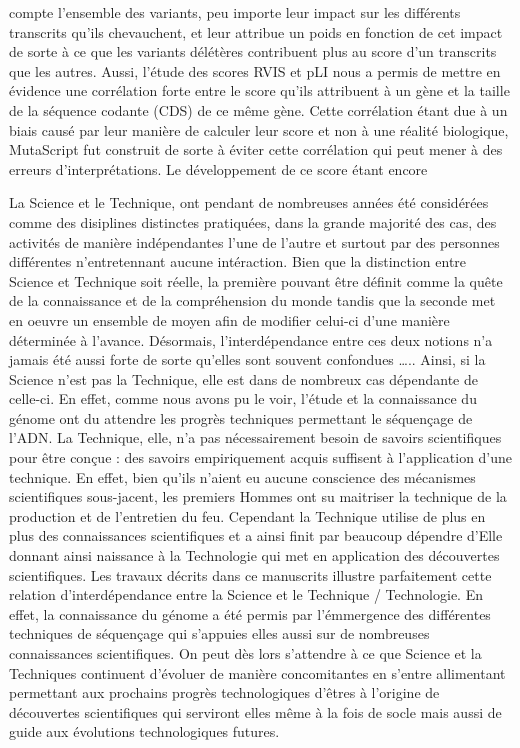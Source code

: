 \documentclass[12pt,twoside]{reedthesis}
\theoremstyle{definition}
\theoremstyle{definition}
\theoremstyle{remark}
\begin{document}
  compte l'ensemble des variants, peu importe leur impact sur les
  différents transcrits qu'ils chevauchent, et leur attribue un poids en
  fonction de cet impact de sorte à ce que les variants délétères
  contribuent plus au score d'un transcrits que les autres. Aussi, l'étude
  des scores RVIS et pLI nous a permis de mettre en évidence une
  corrélation forte entre le score qu'ils attribuent à un gène et la
  taille de la séquence codante (CDS) de ce même gène. Cette corrélation
  étant due à un biais causé par leur manière de calculer leur score et
  non à une réalité biologique, MutaScript fut construit de sorte à éviter
  cette corrélation qui peut mener à des erreurs d'interprétations. Le
  développement de ce score étant encore
  
  La Science et le Technique, ont pendant de nombreuses années été
  considérées comme des disiplines distinctes pratiquées, dans la grande
  majorité des cas, des activités de manière indépendantes l'une de
  l'autre et surtout par des personnes différentes n'entretennant aucune
  intéraction. Bien que la distinction entre Science et Technique soit
  réelle, la première pouvant être définit comme la quête de la
  connaissance et de la compréhension du monde tandis que la seconde met
  en oeuvre un ensemble de moyen afin de modifier celui-ci d'une manière
  déterminée à l'avance. Désormais, l'interdépendance entre ces deux
  notions n'a jamais été aussi forte de sorte qu'elles sont souvent
  confondues \ldots{}.. Ainsi, si la Science n'est pas la Technique, elle
  est dans de nombreux cas dépendante de celle-ci. En effet, comme nous
  avons pu le voir, l'étude et la connaissance du génome ont du attendre
  les progrès techniques permettant le séquençage de l'ADN. La Technique,
  elle, n'a pas nécessairement besoin de savoirs scientifiques pour être
  conçue : des savoirs empiriquement acquis suffisent à l'application
  d'une technique. En effet, bien qu'ils n'aient eu aucune conscience des
  mécanismes scientifiques sous-jacent, les premiers Hommes ont su
  maitriser la technique de la production et de l'entretien du feu.
  Cependant la Technique utilise de plus en plus des connaissances
  scientifiques et a ainsi finit par beaucoup dépendre d'Elle donnant
  ainsi naissance à la Technologie qui met en application des découvertes
  scientifiques. Les travaux décrits dans ce manuscrits illustre
  parfaitement cette relation d'interdépendance entre la Science et le
  Technique / Technologie. En effet, la connaissance du génome a été
  permis par l'émmergence des différentes techniques de séquençage qui
  s'appuies elles aussi sur de nombreuses connaissances scientifiques. On
  peut dès lors s'attendre à ce que Science et la Techniques continuent
  d'évoluer de manière concomitantes en s'entre allimentant permettant aux
  prochains progrès technologiques d'êtres à l'origine de découvertes
  scientifiques qui serviront elles même à la fois de socle mais aussi de
  guide aux évolutions technologiques futures.
  
\end{document}
